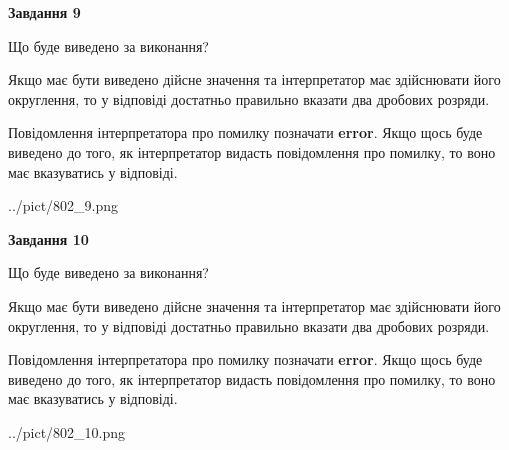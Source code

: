 \documentclass[12pt, ukrainian]{article}
\begin{document}
{\begin {Large}
{\begin {center}\textbf{Завдання 9}\end {center}}\par
Що буде виведено за виконання? \par

Якщо має бути виведено дійсне значення та інтерпретатор має здійснювати його округлення, 
то у відповіді достатньо правильно вказати два дробових розряди.

Повідомлення інтерпретатора про помилку позначати \textbf{error}.
Якщо щось буде виведено до того, як інтерпретатор видасть повідомлення про помилку, 
то воно має вказуватись у відповіді. \par

\begin{center}
	{../pict/802_9.png}
\end{center}
\newpage

{\begin {center}\textbf{Завдання 10}\end {center}}\par
Що буде виведено за виконання? \par

Якщо має бути виведено дійсне значення та інтерпретатор має здійснювати його округлення, 
то у відповіді достатньо правильно вказати два дробових розряди.

Повідомлення інтерпретатора про помилку позначати \textbf{error}.
Якщо щось буде виведено до того, як інтерпретатор видасть повідомлення про помилку, 
то воно має вказуватись у відповіді. \par

\begin{center}
	{../pict/802_10.png}
\end{center}
\newpage

\end {Large}}
\end{document}
